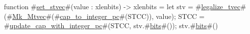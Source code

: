 function #\hyperref[sailRISCVzsetzystvec]{set\_stvec}#(value : xlenbits) -> xlenbits = {
  let stv = #\hyperref[sailRISCVzlegalizzezytvec]{legalize\_tvec}#(#\hyperref[sailRISCVzMkzyMtvec]{Mk\_Mtvec}#(#\hyperref[sailRISCVzcapzytozyintegerzypc]{cap\_to\_integer\_pc}#(STCC)), value);
  STCC = #\hyperref[sailRISCVzupdatezycapzywithzyintegerzypc]{update\_cap\_with\_integer\_pc}#(STCC, stv.#\hyperref[sailRISCVzbits]{bits}#());
  stv.#\hyperref[sailRISCVzbits]{bits}#()
}

